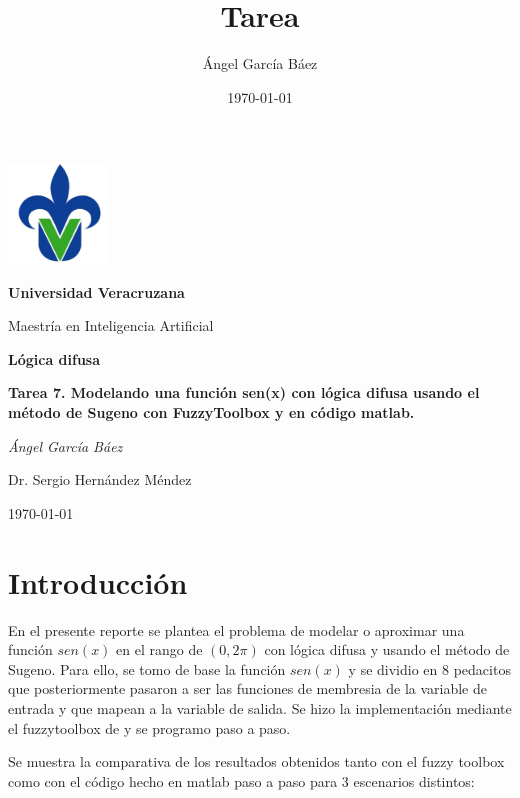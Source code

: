 \documentclass[11pt, letterpaper]{article}
\title{\bfseries Tarea}
\author{Ángel García Báez}
\date{\today}
\begin{document}
	
	\begin{titlepage}
		\centering
		\includegraphics[width=0.2\textwidth]{logo.png}\par
		\vspace{1cm}
		{\LARGE \bfseries Universidad Veracruzana \par}
		\vspace{1cm}
		{\Large Maestría en Inteligencia Artificial\par}
		\vspace{3cm}
		{\LARGE \bfseries Lógica difusa \par}
		\vspace{1cm}
		{\Large \bfseries Tarea 7. Modelando una función sen(x) con lógica difusa usando el método de Sugeno con FuzzyToolbox y en código matlab. \par}
		\vfill
		{\Large \textit{Ángel García Báez}\par}
		\vfill
		{\Large Dr. Sergio Hernández Méndez \par}
		\vfill
		{\Large \today \par}
	\end{titlepage}
	
	\newpage
	\tableofcontents
	\newpage
	

\section{Introducción}

En el presente reporte se plantea el problema de modelar o aproximar una función $sen(x)$ en el rango de $(0,2\pi)$ con lógica difusa y usando el método de Sugeno. Para ello, se tomo de base la función $sen(x)$ y se dividio en 8 pedacitos que posteriormente pasaron a ser las funciones de membresia de la variable de entrada y que mapean a la variable de salida.
Se hizo la implementación mediante el fuzzytoolbox de y se programo paso a paso.

Se muestra la comparativa de los resultados obtenidos tanto con el fuzzy toolbox como con el código hecho en matlab paso a paso para 3 escenarios distintos:
\end{document}
